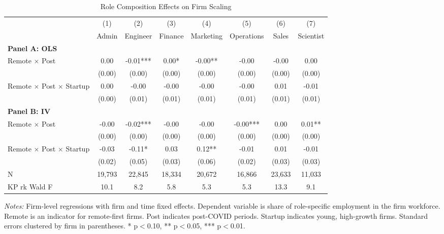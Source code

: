 \documentclass[11pt]{article}
\begin{document}
\begin{table}[H]
\centering
\caption{Role Composition Effects on Firm Scaling}
\begin{threeparttable}
\begin{adjustbox}{width=\textwidth}
\begin{tabular}{lccccccc}
\toprule
 & (1) & (2) & (3) & (4) & (5) & (6) & (7) \\
 & Admin & Engineer & Finance & Marketing & Operations & Sales & Scientist \\
\midrule
\multicolumn{8}{l}{\textbf{Panel A: OLS}} \\
\addlinespace
Remote $\times$ Post & 0.00 & -0.01*** & 0.00* & -0.00** & -0.00 & -0.00 & 0.00 \\
  & (0.00) & (0.00) & (0.00) & (0.00) & (0.00) & (0.00) & (0.00) \\
\addlinespace[0.5em]
Remote $\times$ Post $\times$ Startup & 0.00 & -0.00 & -0.00 & -0.00 & -0.00 & 0.01 & -0.01 \\
  & (0.00) & (0.01) & (0.01) & (0.01) & (0.01) & (0.01) & (0.01) \\
\midrule
\multicolumn{8}{l}{\textbf{Panel B: IV}} \\
\addlinespace
Remote $\times$ Post & -0.00 & -0.02*** & -0.00 & -0.00 & -0.00*** & 0.00 & 0.01** \\
  & (0.00) & (0.00) & (0.00) & (0.00) & (0.00) & (0.00) & (0.00) \\
\addlinespace[0.5em]
Remote $\times$ Post $\times$ Startup & -0.03 & -0.11* & 0.03 & 0.12** & -0.01 & 0.01 & -0.01 \\
  & (0.02) & (0.05) & (0.03) & (0.06) & (0.02) & (0.03) & (0.03) \\
\midrule
N & 19,793 & 22,845 & 18,334 & 20,672 & 16,866 & 23,633 & 11,033 \\
KP rk Wald F & 10.1 & 8.2 & 5.8 & 5.3 & 5.3 & 13.3 & 9.1 \\
\bottomrule
\end{tabular}
\end{adjustbox}
\begin{tablenotes}
\small
\item \textit{Notes:} Firm-level regressions with firm and time fixed effects. 
Dependent variable is share of role-specific employment in the firm workforce. 
Remote is an indicator for remote-first firms. Post indicates post-COVID periods.
Startup indicates young, high-growth firms.
Standard errors clustered by firm in parentheses. 
* p$<$0.10, ** p$<$0.05, *** p$<$0.01.
\end{tablenotes}
\end{threeparttable}
\end{table}
\end{document}

